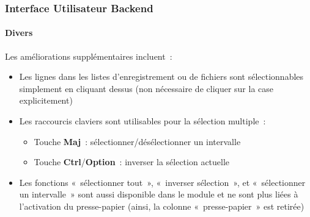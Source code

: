 %

\begin{frame}[fragile]
	\frametitle{Interface Utilisateur Backend}
	\framesubtitle{Divers}

	Les améliorations supplémentaires incluent~:

	\begin{itemize}
		\item Les lignes dans les listes d'enregistrement ou de fichiers sont sélectionnables
			simplement en cliquant dessus (non nécessaire de cliquer sur la case explicitement)
		\item Les raccourcis claviers sont utilisables pour la sélection multiple~:
			\begin{itemize}
				\item Touche \textbf{Maj}~: sélectionner/désélectionner un intervalle
				\item Touche \textbf{Ctrl}/\textbf{Option}~: inverser la sélection actuelle
			\end{itemize}
		\item Les fonctions «~sélectionner tout~», «~inverser sélection~», et «~sélectionner
		    un intervalle~» sont aussi disponible dans le module et ne sont plus liées à
		    l'activation du presse-papier (ainsi, la colonne «~presse-papier~» est retirée)
	\end{itemize}

\end{frame}

